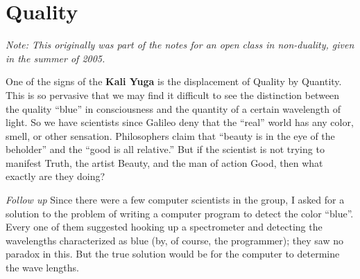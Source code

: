 \section{Quality}

\emph{Note: This originally was part of the notes for an open class in non-duality, given in the summer of 2005.}

One of the signs of the \textbf{Kali Yuga} is the displacement of Quality by Quantity. This is so pervasive that we may find it difficult to see the distinction between the quality ``blue'' in consciousness and the quantity of a certain wavelength of light. So we have scientists since Galileo deny that the ``real'' world has any color, smell, or other sensation. Philosophers claim that ``beauty is in the eye of the beholder'' and the ``good is all relative.'' But if the scientist is not trying to manifest Truth, the artist Beauty, and the man of action Good, then what exactly are they doing?

\emph{Follow up} Since there were a few computer scientists in the group, I asked for a solution to the problem of writing a computer program to detect the color ``blue''. Every one of them suggested hooking up a spectrometer and detecting the wavelengths characterized as blue (by, of course, the programmer); they saw no paradox in this. But the true solution would be for the computer to determine the wave lengths.



